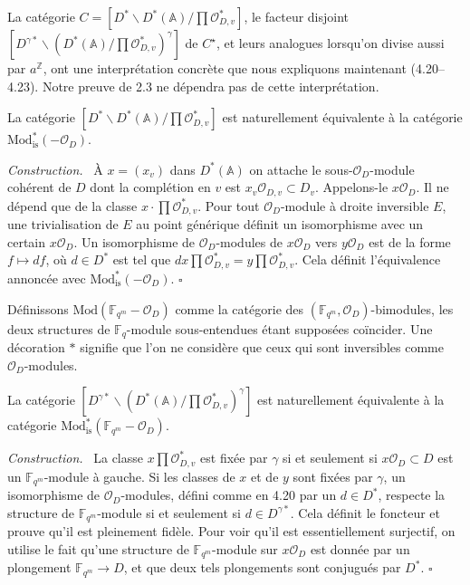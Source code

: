 \documentclass[10pt]{article}
\newcommand{\Fq}{\mathbb F_q}
\newcommand{\Fqm}{\mathbb F_{q^m}}
\newcommand{\Z}{\mathbb Z}
\newcommand{\Adele}{\mathbb A}
\newcommand{\OD}{\mathcal O_D}
\theoremstyle{deligne}
\newenvironment{proofdel}[1][Preuve.]{\textit{#1}\ }{\hfill$\square$}
\newcommand{\heading}[1]{\vspace{0.7em}\noindent{\bfseries #1}\quad}
\begin{document}
La catégorie $C=[D^*\backslash D^*(\Adele)/\prod\mathcal O_{D,v}^*]$, le facteur disjoint $[D^{\gamma *}\backslash(D^*(\Adele)/\prod\mathcal O_{D,v}^*)^\gamma]$ de $C^\star$, et leurs analogues lorsqu'on divise aussi par $a^\Z$, ont une interprétation concrète que nous expliquons maintenant (4.20--4.23). Notre preuve de 2.3 ne dépendra pas de cette interprétation.

\heading{Construction 4.20.} La catégorie $[D^*\backslash D^*(\Adele)/\prod\mathcal O_{D,v}^*]$ est naturellement équivalente à la catégorie $\mathrm{Mod}_{\mathrm{is}}^*(-\OD)$.

\begin{proofdel}[Construction.]
À $x=(x_v)$ dans $D^*(\Adele)$ on attache le sous-$\OD$-module cohérent de $D$ dont la complétion en $v$ est $x_v\mathcal O_{D,v}\subset D_v$. Appelons-le $x\OD$. Il ne dépend que de la classe $x\cdot\prod\mathcal O_{D,v}^*$. Pour tout $\OD$-module à droite inversible $E$, une trivialisation de $E$ au point générique définit un isomorphisme avec un certain $x\OD$. Un isomorphisme de $\OD$-modules de $x\OD$ vers $y\OD$ est de la forme $f\mapsto df$, où $d\in D^*$ est tel que $dx\prod\mathcal O_{D,v}^*=y\prod\mathcal O_{D,v}^*$. Cela définit l'équivalence annoncée avec $\mathrm{Mod}_{\mathrm{is}}^*(-\OD)$.
\end{proofdel}

Définissons $\mathrm{Mod}(\Fqm-\OD)$ comme la catégorie des $(\Fqm,\OD)$-bimodules, les deux structures de $\Fq$-module sous-entendues étant supposées coïncider. Une décoration $*$ signifie que l'on ne considère que ceux qui sont inversibles comme $\OD$-modules.

\heading{Construction 4.21.} La catégorie $[D^{\gamma *}\backslash(D^*(\Adele)/\prod\mathcal O_{D,v}^*)^\gamma]$ est naturellement équivalente à la catégorie $\mathrm{Mod}_{\mathrm{is}}^*(\Fqm-\OD)$.

\begin{proofdel}[Construction.]
La classe $x\prod\mathcal O_{D,v}^*$ est fixée par $\gamma$ si et seulement si $x\OD\subset D$ est un $\Fqm$-module à gauche. Si les classes de $x$ et de $y$ sont fixées par $\gamma$, un isomorphisme de $\OD$-modules, défini comme en 4.20 par un $d\in D^*$, respecte la structure de $\Fqm$-module si et seulement si $d\in D^{\gamma *}$. Cela définit le foncteur et prouve qu'il est pleinement fid\`ele. Pour voir qu'il est essentiellement surjectif, on utilise le fait qu'une structure de $\Fqm$-module sur $x\OD$ est donnée par un plongement $\Fqm\to D$, et que deux tels plongements sont conjugués par $D^*$.
\end{proofdel}
\end{document}

